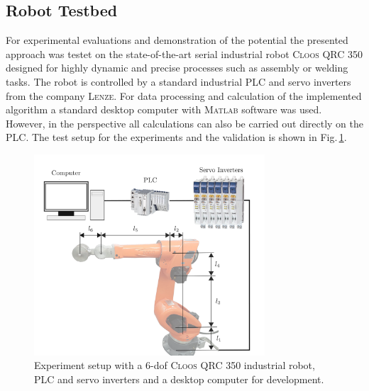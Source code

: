 
\subsection{Robot Testbed}
\label{subsec:RobotTestbed}
For experimental evaluations and demonstration of the potential the presented approach was testet on the state-of-the-art serial industrial  robot \textsc{Cloos QRC 350} designed for highly dynamic and precise processes such as assembly or welding tasks. 
The robot is controlled by a standard industrial PLC and servo inverters from the company \textsc{Lenze}. 
For data processing and calculation of the implemented algorithm a standard desktop computer with \textsc{Matlab} software was used. 
However, in the perspective all calculations can also be carried out directly on the PLC. 
The test setup for the experiments and the validation is shown in Fig.\,\ref{fig:testbench}. 

\begin{figure}[!ht]             %
    \centering                  %
    \def\svgwidth{\textwidth/2}    
    \includegraphics[width=8.6cm]{Chapters/Experiments/Robot_Testbed/Cloos_cover} 
               \caption{Experiment setup with a 6-dof \textsc{Cloos QRC 350} industrial robot, PLC and servo inverters and a desktop computer for development.}
   \label{fig:testbench}
\end{figure}





